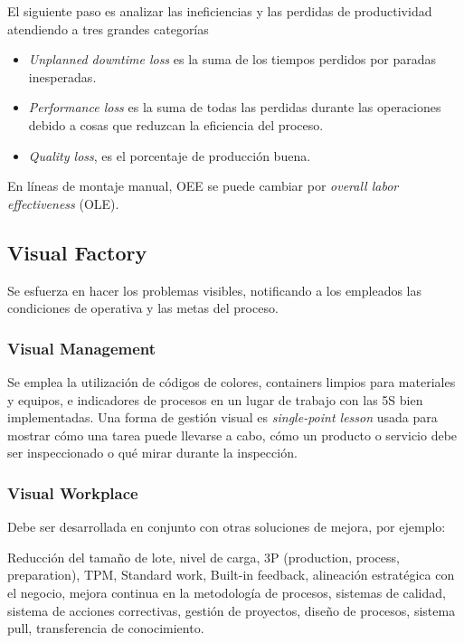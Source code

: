 \documentclass[]{article}
\begin{document}
El siguiente paso es analizar las ineficiencias y las perdidas de productividad atendiendo a tres grandes categorías

\begin{itemize}
	\item \textit{Unplanned downtime loss} es la suma de los tiempos perdidos por paradas inesperadas. 
	\item \textit{Performance loss} es la suma de todas las perdidas durante las operaciones debido a cosas que reduzcan la eficiencia del proceso.
	\item \textit{Quality loss}, es el porcentaje de producción buena.
\end{itemize}

En líneas de montaje manual, OEE se puede cambiar por \textit{overall labor effectiveness} (OLE).

\subsection{Visual Factory}

Se esfuerza en hacer los problemas visibles, notificando a los empleados las condiciones de operativa y las metas del proceso.

\subsubsection{Visual Management}

Se emplea la utilización de códigos de colores, containers limpios para materiales y equipos, e indicadores de procesos en un lugar de trabajo con las 5S bien implementadas. Una forma de gestión visual es \textit{single-point lesson} usada para mostrar cómo una tarea puede llevarse a cabo, cómo un producto o servicio debe ser inspeccionado o qué mirar durante la inspección.

\subsubsection{Visual Workplace}

Debe ser desarrollada en conjunto con otras soluciones de mejora, por ejemplo:

Reducción del tamaño de lote, nivel de carga, 3P (production, process, preparation), TPM, Standard work, Built-in feedback, alineación estratégica con el negocio, mejora continua en la metodología de procesos, sistemas de calidad, sistema de acciones correctivas, gestión de proyectos, diseño de procesos, sistema pull, transferencia de conocimiento.
\end{document}
